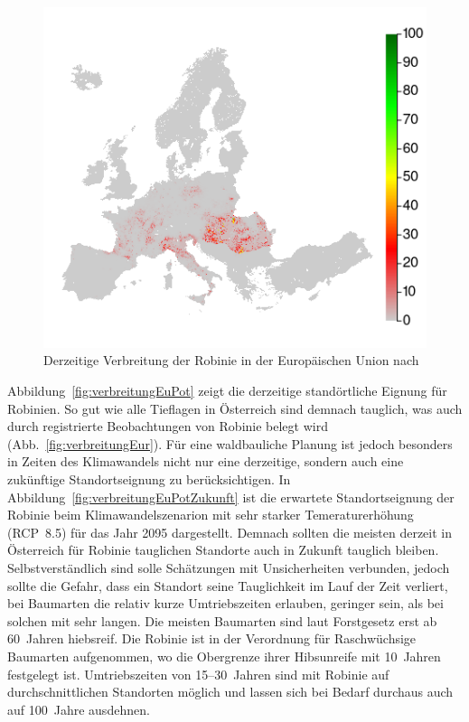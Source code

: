 \documentclass[twocolumn]{scrartcl}
\begin{document}
\begin{figure}[htbp]
  \centering
  \includegraphics[width=.9\linewidth]{./bild/verbreitungEuropa}
  \caption{Derzeitige Verbreitung der Robinie in der Europäischen Union nach \cite{jrc2016treeAtlas}}
  \label{fig:verbreitungEuJetzt}
\end{figure}

Abbildung~\ref{fig:verbreitungEuPot} zeigt die derzeitige standörtliche Eignung
für Robinien. So gut wie alle Tieflagen in Österreich sind demnach tauglich, was
auch durch registrierte Beobachtungen von Robinie belegt wird
(Abb.~\ref{fig:verbreitungEur}). Für eine waldbauliche Planung ist jedoch
besonders in Zeiten des Klimawandels nicht nur eine derzeitige, sondern auch
eine zukünftige Standortseignung zu berücksichtigen. In
Abbildung~\ref{fig:verbreitungEuPotZukunft} ist die erwartete Standortseignung
der Robinie beim Klimawandelszenarion mit sehr starker Temeraturerhöhung
(RCP~8.5) für das Jahr 2095 dargestellt. Demnach sollten die meisten derzeit in
Österreich für Robinie tauglichen Standorte auch in Zukunft tauglich bleiben.
Selbstverständlich sind solle Schätzungen mit Unsicherheiten verbunden, jedoch
sollte die Gefahr, dass ein Standort seine Tauglichkeit im Lauf der Zeit
verliert, bei Baumarten die relativ kurze Umtriebszeiten erlauben, geringer
sein, als bei solchen mit sehr langen. Die meisten Baumarten sind laut
Forstgesetz erst ab 60~Jahren hiebsreif. Die Robinie ist in der Verordnung für
Raschwüchsige Baumarten aufgenommen, wo die Obergrenze ihrer Hibsunreife mit
10~Jahren festgelegt ist. Umtriebszeiten von 15--30~Jahren sind mit Robinie auf
durchschnittlichen Standorten möglich und lassen sich bei Bedarf durchaus auch
auf 100~Jahre ausdehnen.
\end{document}
